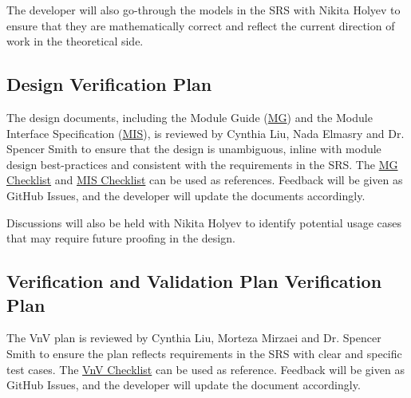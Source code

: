 \documentclass[12pt, titlepage]{article}
\begin{document}
The developer will also go-through the models in the SRS with Nikita Holyev to ensure that they are mathematically correct and reflect the current direction of work in the theoretical side.



\subsection{Design Verification Plan}

The design documents, including the Module Guide (\href{https://github.com/omltcat/turbulent-flow/blob/main/docs/Design/SoftArchitecture/MG.pdf}{MG}) and the Module Interface Specification (\href{https://github.com/omltcat/turbulent-flow/blob/main/docs/Design/SoftDetailedDes/MIS.pdf}{MIS}), is reviewed by Cynthia Liu, Nada Elmasry and Dr. Spencer Smith to ensure that the design is unambiguous, inline with module design best-practices and consistent with the requirements in the SRS. The \href{https://github.com/omltcat/turbulent-flow/blob/main/docs/Checklists/MG-Checklist.pdf}{MG Checklist} and \href{https://github.com/omltcat/turbulent-flow/blob/main/docs/Checklists/MIS-Checklist.pdf}{MIS Checklist} can be used as references. Feedback will be given as GitHub Issues, and the developer will update the documents accordingly.

Discussions will also be held with Nikita Holyev to identify potential usage cases that may require future proofing in the design.





\subsection{Verification and Validation Plan Verification Plan}

The VnV plan is reviewed by Cynthia Liu, Morteza Mirzaei and Dr. Spencer Smith to ensure the plan reflects requirements in the SRS with clear and specific test cases. The \href{https://github.com/omltcat/turbulent-flow/blob/main/docs/Checklists/VnV-Checklist.pdf}{VnV Checklist} can be used as reference. Feedback will be given as GitHub Issues, and the developer will update the document accordingly.
 
\end{document}
